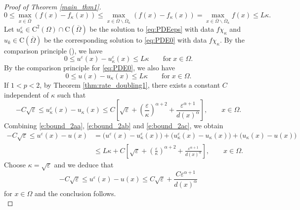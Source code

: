 \documentclass[12pt,reqno]{amsart}
\numberwithin{figure}{section}
\theoremstyle{plain}
\theoremstyle{remark}
\numberwithin{equation}{section}
\newcommand{\rmC}{\mathrm{C}}
\begin{document}
\begin{proof}[Proof of Theorem \ref{main_thm1}]
\begin{equation*}
    0\leq \max_{x\in \overline{\Omega}} (f(x) - f_\kappa(x)) \leq \max_{x\in \overline{\Omega}\backslash \overline{\Omega}_\kappa} (f(x) - f_\kappa(x)) = \max_{x\in \overline{\Omega}\backslash \overline{\Omega}_\kappa} f(x) \leq L\kappa.
\end{equation*}
Let $u^\varepsilon_\kappa\in \rmC^2(\Omega)\cap\rmC(\overline{\Omega})$ be the solution to \eqref{eq:PDEeps} with data $f\chi_{\kappa}$ and $u_k\in \mathrm{C}(\overline{\Omega})$ be the corresponding solution to \eqref{eq:PDE0} with data $f{\chi_\kappa}$. By the comparison principle (\cite[Corollary II.1]{Lasry1989}), we have
\begin{equation}\label{e:bound_2aa}
    0\leq u^\varepsilon(x) - u^\varepsilon_\kappa(x) \leq L\kappa \qquad\text{for}\;x\in \Omega.
\end{equation}
By the comparison principle for \eqref{eq:PDE0}, we also have
\begin{equation}\label{e:bound_2ab}
    0\leq u(x) - u_\kappa(x) \leq L\kappa \qquad\text{for}\;x\in \Omega.
\end{equation}
If $1<p<2$, by Theorem \ref{thm:rate_doubling1}, there exists a constant $C$ independent of $\kappa$ such that
\begin{equation}\label{e:bound_2ac}
    -C\sqrt{\varepsilon}\leq u^\varepsilon_\kappa(x) - u_\kappa(x)\leq C\left[\sqrt{\varepsilon} + \left(\frac{\varepsilon}{\kappa}\right)^{\alpha+2} + \frac{\varepsilon^{\alpha+1}}{d(x)^\alpha}\right], \qquad x\in \Omega.
\end{equation}
Combining \eqref{e:bound_2aa}, \eqref{e:bound_2ab} and \eqref{e:bound_2ac}, we obtain
\begin{equation*}
\begin{split}
   -C\sqrt{\varepsilon}\leq u^\varepsilon(x) - u(x) &= \Big(u^\varepsilon(x) - u^\varepsilon_\kappa(x)\Big) + \Big(u^\varepsilon_\kappa(x) - u_\kappa(x)\Big) + \Big(u_\kappa(x) - u(x)\Big) \\
    &\leq L\kappa + C\left[\sqrt{\varepsilon}  + \left(\frac{\varepsilon}{\kappa}\right)^{\alpha+2} + \frac{\varepsilon^{\alpha+1}}{d(x)^\alpha}\right], \qquad x\in \Omega.
\end{split}
\end{equation*}
Choose $\kappa = \sqrt{\varepsilon}$ and we deduce that
\begin{equation*}
    -C\sqrt{\varepsilon}\leq u^\varepsilon(x) - u(x) \leq C\sqrt{\varepsilon} + \frac{C\varepsilon^{\alpha+1}}{d(x)^\alpha}
\end{equation*}
for $x\in \Omega$ and the conclusion follows. \\


\end{proof}
\end{document}
